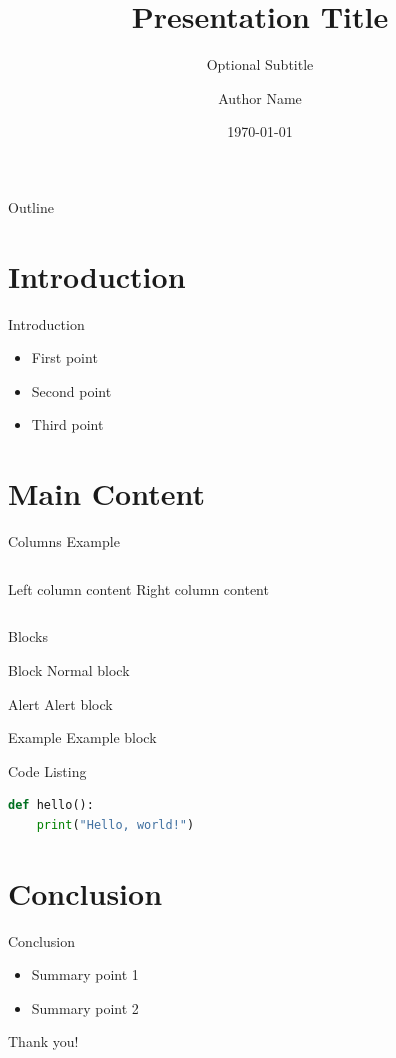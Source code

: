 \documentclass[aspectratio=169]{beamer}
\title{Presentation Title}
\subtitle{Optional Subtitle}
\author{Author Name}
\institute{Institute}
\date{\today}
\begin{document}
\begin{frame}
  \titlepage
\end{frame}

\begin{frame}{Outline}
  \tableofcontents
\end{frame}

\section{Introduction}

\begin{frame}{Introduction}
  \begin{itemize}
    \item First point
    \item Second point
    \item Third point
  \end{itemize}
\end{frame}

\section{Main Content}

\begin{frame}{Columns Example}
  \begin{columns}[T]
      Left column content
      Right column content
  \end{columns}
\end{frame}

\begin{frame}{Blocks}
  \begin{block}{Block}
    Normal block
  \end{block}
  \begin{alertblock}{Alert}
    Alert block
  \end{alertblock}
  \begin{exampleblock}{Example}
    Example block
  \end{exampleblock}
\end{frame}

\begin{frame}[fragile]{Code Listing}
  \begin{lstlisting}[language=Python]
def hello():
    print("Hello, world!")
  \end{lstlisting}
\end{frame}

\section{Conclusion}

\begin{frame}{Conclusion}
  \begin{itemize}
    \item Summary point 1
    \item Summary point 2
  \end{itemize}
  \vfill
  \begin{center}
    \Large Thank you!
  \end{center}
\end{frame}
\end{document}

